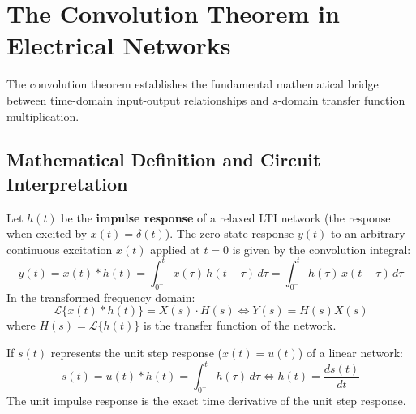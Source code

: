 \documentclass[12pt,a4paper]{article}
\begin{document}
\section{The Convolution Theorem in Electrical Networks}

The convolution theorem establishes the fundamental mathematical bridge between time-domain input-output relationships and $s$-domain transfer function multiplication.

\subsection{Mathematical Definition and Circuit Interpretation}

\begin{tcolorbox}[defbox, title={\textbf{Time Convolution Theorem}}]
Let $h(t)$ be the \textbf{impulse response} of a relaxed LTI network (the response when excited by $x(t) = \delta(t)$). The zero-state response $y(t)$ to an arbitrary continuous excitation $x(t)$ applied at $t=0$ is given by the convolution integral:
\begin{equation}
  y(t) = x(t) * h(t) = \int_{0^-}^t x(\tau)\,h(t - \tau)\,d\tau = \int_{0^-}^t h(\tau)\,x(t - \tau)\,d\tau
\end{equation}
In the transformed frequency domain:
\begin{equation}
  \mathcal{L}\{x(t) * h(t)\} = X(s) \cdot H(s) \iff Y(s) = H(s) X(s)
\end{equation}
where $H(s) = \mathcal{L}\{h(t)\}$ is the transfer function of the network.
\end{tcolorbox}

\begin{tcolorbox}[formulabox, title={\textbf{Relation Between Impulse Response and Step Response}}]
If $s(t)$ represents the unit step response ($x(t) = u(t)$) of a linear network:
\begin{equation}
  s(t) = u(t) * h(t) = \int_{0^-}^t h(\tau)\,d\tau \iff h(t) = \frac{ds(t)}{dt}
\end{equation}
The unit impulse response is the exact time derivative of the unit step response.
\end{tcolorbox}

\end{document}
